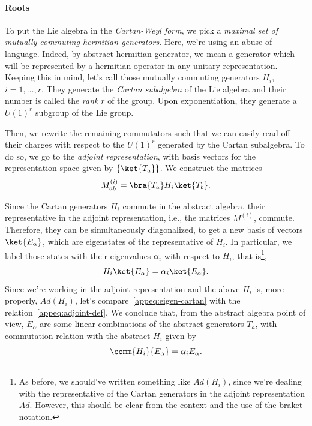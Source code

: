 \paragraph{Roots}
To put the Lie algebra in the \emph{Cartan-Weyl form}, we pick a \emph{maximal set of mutually commuting hermitian generators}. Here, we're using an abuse of language. Indeed, by abstract hermitian generator, we mean a generator which will be represented by a hermitian operator in any unitary representation. Keeping this in mind, let's call those mutually commuting generators $H_i$, $i = 1, \dots, r$. They generate the \emph{Cartan subalgebra} of the Lie algebra and their number is called the \emph{rank} $r$ of the group. Upon exponentiation, they generate a $U(1)^r$ subgroup of the Lie group.

Then, we rewrite the remaining commutators such that we can easily read off their charges with respect to the $U(1)^r$ generated by the Cartan subalgebra. To do so, we go to the \emph{adjoint representation}, with basis vectors for the representation space given by $\{ \ket{T_a} \}$. We construct the matrices
\begin{equation}
   M_{ab}^{(i)} = \bra{T_a}H_i\ket{T_b}  .
\end{equation}

Since the Cartan generators $H_i$ commute in the abstract algebra, their representative in the adjoint representation, i.e., the matrices $M^{(i)}$, commute. Therefore, they can be simultaneously diagonalized, to get a new basis of vectors $\ket{E_\alpha}$, which are eigenstates of the representative of $H_i$. In particular, we label those states with their eigenvalues $\alpha_i$ with respect to $H_i$, that is\footnote{As before, we should've written something like $Ad(H_i)$, since we're dealing with the representative of the Cartan generators in the adjoint representation $Ad$. However, this should be clear from the context and the use of the braket notation.},
\begin{equation}\label{appeq:eigen-cartan}
    H_i \ket{E_\alpha} = \alpha_i \ket{E_\alpha}.
\end{equation}
Since we're working in the adjoint representation and the above $H_i$ is, more properly, $Ad(H_i)$, let's compare~\eqref{appeq:eigen-cartan} with the relation~\eqref{appeq:adjoint-def}. We conclude that, from the abstract algebra point of view, $E_\alpha$ are some linear combinations of the abstract generators $T_a$, with commutation relation with the abstract $H_i$ given by
\begin{equation}\label{appeq:HE-comm}
    \comm{H_i}{E_\alpha} = \alpha_i E_\alpha .
\end{equation}

